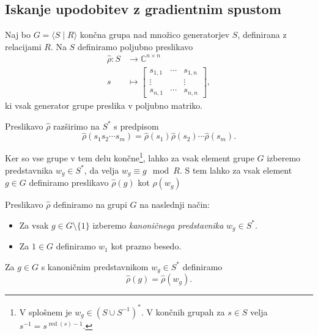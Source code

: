 \documentclass[mat2, tisk]{fmfdelo}
\newcommand{\C}{\mathbb C}
\newcommand{\mon}{(S\cup S ^{-1})^*}
\begin{document}
\subsection{Iskanje upodobitev z gradientnim spustom}
\label{subsection: Iskanje upodobitev z gradientnim spustom}
Naj bo $G=\langle S \mid R \rangle$ končna grupa nad množico generatorjev $S$,
definirana z relacijami $R$. Na $S$ definiramo poljubno preslikavo
\begin{align}
  \label{eq: repr model na S}
  \hat \rho \colon S &\to \C^{n \times n}    \\
  s &\mapsto
  \begin{bmatrix}
    s_{1,1} & \cdots & s_{1,n} \\
    \vdots & & \vdots \\
    s_{n,1} & \cdots & s_{n,n}
  \end{bmatrix},
\end{align}
ki vsak generator grupe preslika v poljubno matriko.
\begin{definicija}
  \label{def:razširitev upodobitev}
  Preslikavo $\hat \rho$ razširimo na $S^*$ s predpisom
  $$
  \hat \rho(s_1 s_2 \dotsm s_m) = \hat \rho(s_1) \hat \rho(s_2)
  \dotsm \hat \rho(s_m).
  $$
\end{definicija}
\begin{opomba}
  Ker so vse grupe v tem delu končne\footnote{V splošnem je
    $w_g \in \mon$.
    V končnih grupah za $s \in S$ velja $s^{-1} =
  s^{\operatorname{red}(s) -1}$.}, lahko za
  vsak element grupe $G$ izberemo predstavnika
  $w_g \in S^*$, da velja
  $w_g \equiv g \mod R$.
  S tem lahko za vsak element $g \in G$
  definiramo preslikavo $\hat \rho(g)$ kot
  $\hat \rho(w_g)$
\end{opomba}
%
\begin{definicija}
  \label{def:razsiritev-repr-modela}
  Preslikavo $\hat \rho$ definiramo na grupi $G$ na naslednji način:
  \begin{itemize}
    \item Za vsak $g \in G\setminus \{1\}$ izberemo
      \emph{kanoničnega predstavnika} $w_g \in S^*$.
    \item Za $1 \in G$ definiramo $w_1$ kot prazno besedo.
  \end{itemize}
  Za $g \in G$ s kanoničnim predstavnikom $w_g \in S^*$ definiramo
  $$
  \hat \rho(g) = \hat \rho(w_g).
  $$
\end{definicija}
\end{document}
